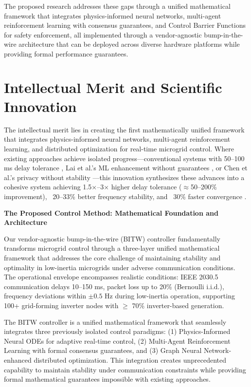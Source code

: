 \documentclass[12pt]{article}
\begin{document}
The proposed research addresses these gaps through a unified mathematical framework that integrates physics-informed neural networks, multi-agent reinforcement learning with consensus guarantees, and Control Barrier Functions for safety enforcement, all implemented through a vendor-agnostic bump-in-the-wire architecture that can be deployed across diverse hardware platforms while providing formal performance guarantees.
\vspace{-0.5cm}
\section{Intellectual Merit and Scientific Innovation}

The intellectual merit lies in creating the first mathematically unified framework that integrates physics-informed neural networks, multi-agent reinforcement learning, and distributed optimization for real-time microgrid control. Where existing approaches achieve isolated progress---conventional systems with 50--100 ms delay tolerance \cite{bidram2012,simpson2013,riverso2013}, Lai et al.'s ML enhancement without guarantees \cite{lai2023}, or Chen et al.'s privacy without stability \cite{chen2024}---this innovation synthesizes these advances into a cohesive system achieving 1.5×--3× higher delay tolerance ($\approx$50--200\% improvement), ~20--33\% better frequency stability, and ~30\% faster convergence \cite{bevrani2021,palizban2014,our2024comparative}.

\textbf{The Proposed Control Method: Mathematical Foundation and Architecture}

Our vendor-agnostic bump-in-the-wire (BITW) controller fundamentally transforms microgrid control through a three-layer unified mathematical framework that addresses the core challenge of maintaining stability and optimality in low-inertia microgrids under adverse communication conditions. The operational envelope encompasses realistic conditions: IEEE 2030.5 communication delays 10--150 ms, packet loss up to 20\% (Bernoulli i.i.d.), frequency deviations within $\pm 0.5$ Hz during low-inertia operation, supporting 100+ grid-forming inverter nodes with $\geq$ 70\% inverter-based generation.

The BITW controller is a unified mathematical framework that seamlessly integrates three previously isolated control paradigms: (1) Physics-Informed Neural ODEs for adaptive real-time control, (2) Multi-Agent Reinforcement Learning with formal consensus guarantees, and (3) Graph Neural Network-enhanced distributed optimization. This integration creates unprecedented capability to maintain stability under communication constraints while providing formal mathematical guarantees impossible with existing approaches.
\end{document}
